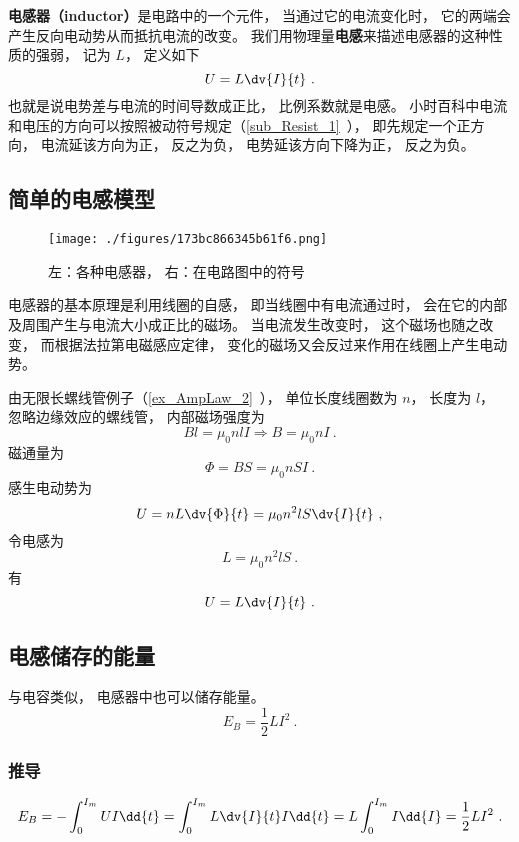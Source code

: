 
\begin{issues}
\issueAbstract
\end{issues}


\textbf{电感器（inductor）}是电路中的一个元件， 当通过它的电流变化时， 它的两端会产生反向电动势从而抵抗电流的改变。 我们用物理量\textbf{电感}来描述电感器的这种性质的强弱， 记为 $L$， 定义如下
\begin{equation}\label{eq_Induct_3}
U = L\dv{I}{t}~.
\end{equation}
也就是说电势差与电流的时间导数成正比， 比例系数就是电感。 小时百科中电流和电压的方向可以按照被动符号规定（\autoref{sub_Resist_1}~）， 即先规定一个正方向， 电流延该方向为正， 反之为负， 电势延该方向下降为正， 反之为负。

\subsection{简单的电感模型}

\begin{figure}[ht]
\centering
\texttt{[image: ./figures/173bc866345b61f6.png]}
\caption{左：各种电感器， 右：在电路图中的符号} \label{fig_Induct_1}
\end{figure}
电感器的基本原理是利用线圈的自感， 即当线圈中有电流通过时， 会在它的内部及周围产生与电流大小成正比的磁场。 当电流发生改变时， 这个磁场也随之改变， 而根据法拉第电磁感应定律， 变化的磁场又会反过来作用在线圈上产生电动势。

由无限长螺线管例子（\autoref{ex_AmpLaw_2}~）， 单位长度线圈数为 $n$， 长度为 $l$， 忽略边缘效应的螺线管， 内部磁场强度为
\begin{equation}
Bl = \mu_0nlI \Rightarrow B = \mu_0nI~.
\end{equation}
磁通量为
\begin{equation}
\Phi = BS = \mu_0nSI~.
\end{equation}
感生电动势为
\begin{equation}
U = nL\dv{\Phi}{t} = \mu_0n^2lS \dv{I}{t}~,
\end{equation}
令电感为
\begin{equation}\label{eq_Induct_1}
L = \mu_0n^2lS~.
\end{equation}
有
\begin{equation}\label{eq_Induct_2}
U = L\dv{I}{t}~.
\end{equation}

\subsection{电感储存的能量}
与电容类似， 电感器中也可以储存能量。
\begin{equation}
E_B = \frac{1}{2}L I^2~.
\end{equation}

\subsubsection{推导}
\begin{equation}
E_B = -\int_0^{I_m} U I \dd{t} = \int_0^{I_m} L \dv{I}{t} I \dd{t} = L\int_0^{I_m} I \dd{I} = \frac{1}{2} L I^2~.
\end{equation}
